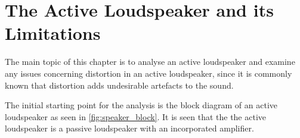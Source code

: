 


\chapter{The Active Loudspeaker and its Limitations}
The main topic of this chapter is to analyse an active loudspeaker and examine any issues concerning distortion in an active loudspeaker, since it is commonly known that distortion adds undesirable artefacts to the sound. %

The initial starting point for the analysis is the block diagram of an active loudspeaker as seen in \autoref{fig:speaker_block}. It is seen that the the active loudspeaker is a passive loudspeaker with an incorporated amplifier.

